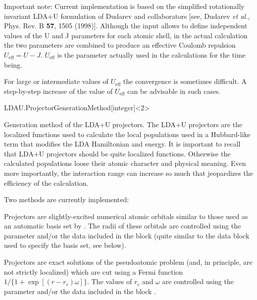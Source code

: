 Important note: Current implementation is based on the simplified
rotationally invariant LDA+U formulation of Dudarev and collaborators
[see, Dudarev \textit{et al.}, Phys. Rev. B \textbf{57}, 1505 (1998)].
Although the input allows to define independent values of the U and J
parameters for each atomic shell, in the actual calculation the two
parameters are combined to produce an effective Coulomb repulsion
$U_{\mathrm{eff}}=U-J$. $U_{\mathrm{eff}}$ is the parameter actually
used in the calculations for the time being.

For large or intermediate values of $U_{\mathrm{eff}}$ the convergence
is sometimes difficult. A step-by-step increase of the
value of $U_{\mathrm{eff}}$ can be advisable in such cases.

\begin{fdfentry}{LDAU.ProjectorGenerationMethod}[integer]<2>
  
  Generation method of the LDA+U projectors. The LDA+U projectors are
  the localized functions used to calculate the local populations used
  in a Hubbard-like term that modifies the LDA Hamiltonian and
  energy. It is important to recall that LDA+U projectors should be
  quite localized functions.  Otherwise the calculated populations
  loose their atomic character and physical meaning. Even more
  importantly, the interaction range can increase so much that
  jeopardizes the efficiency of the calculation.

  Two methods are currently implemented:
  \begin{fdfoptions}
    \option[1]%
    Projectors are slightly-excited numerical atomic orbitals similar
    to those used as an automatic basis set by \siesta.  The radii of
    these orbitals are controlled using the parameter
     and/or the data included in the block
     (quite similar to the data block 
    used to specify the basis set, see below).

    \option[2]%
    Projectors are exact solutions of the pseudoatomic problem (and,
    in principle, are not strictly localized) which are cut using a
    Fermi function $1/\{1+\exp[(r-r_c)\omega]\}$.  The values of $r_c$
    and $\omega$ are controlled using the parameter 
    and/or the data included in the block .

  \end{fdfoptions}

\end{fdfentry}

